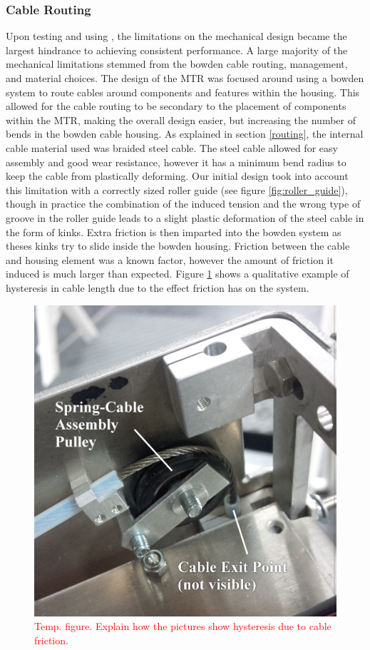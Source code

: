 \subsubsection{Cable Routing}
Upon testing and using \SB{}, the limitations on the mechanical design became the largest hindrance to achieving consistent performance.
A large majority of the mechanical limitations stemmed from the bowden cable routing, management, and material choices.
The design of the MTR was focused around using a bowden system to route cables around components and features within the housing.
This allowed for the cable routing to be secondary to the placement of components within the MTR, making the overall design easier, but increasing the number of bends in the bowden cable housing.
As explained in section \ref{routing}, the internal cable material used was braided steel cable.
The steel cable allowed for easy assembly and good wear resistance, however it has a minimum bend radius to keep the cable from plastically deforming.
Our initial design took into account this limitation with a correctly sized roller guide (see figure \ref{fig:roller_guide}), though in practice the combination of the induced tension and the wrong type of groove in the roller guide leads to a slight plastic deformation of the steel cable in the form of kinks.
Extra friction is then imparted into the bowden system as theses kinks try to slide inside the bowden housing.
Friction between the cable and housing element was a known factor, however the amount of friction it induced is much larger than expected.
Figure \ref{fig:cable_friction} shows a qualitative example of hysteresis in cable length due to the effect friction has on the system.

\begin{figure}[thpb]
      \centering
      \includegraphics[width=0.6\columnwidth]{tex/img/cable_pulley_bearing_labelled_fixedfonts}
      \caption{\textcolor{red}{Temp. figure. Explain how the pictures show hysteresis due to cable friction.}}
      \label{fig:cable_friction}
\end{figure}

